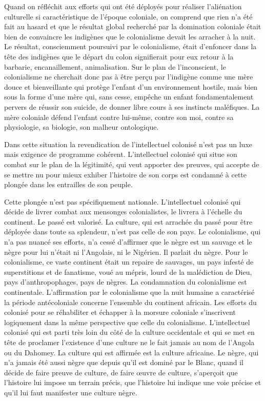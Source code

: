 \documentclass[french,twoside]{book} %
\begin{document}
\bigbreak
\noindent Quand on réfléchit aux efforts qui ont été déployés pour réaliser l’aliénation culturelle si caractéristique de l’époque coloniale, on comprend que rien n’a été fait au hasard et que le résultat global recherché par la domination coloniale était bien de convaincre les indigènes que le colonialisme devait les arracher à la nuit. Le résultat, consciemment poursuivi par le colonialisme, était d’enfoncer dans la tête des indigènes que le départ du colon signifierait pour eux retour à la barbarie, encanaillement, animalisation. Sur le plan de l’inconscient, le colonialisme ne cherchait donc pas à être perçu par l’indigène comme une mère douce et bienveillante qui protège l’enfant d’un environnement hostile, mais bien sous la forme d’une mère qui, sans cesse, empêche un enfant fondamentalement pervers de réussir son suicide, de donner libre cours à ses instincts maléfiques. La mère coloniale défend l’enfant contre lui-même, contre son moi, contre sa physiologie, sa biologie, son malheur ontologique.\par
\bigbreak
\noindent Dans cette situation la revendication de l’intellectuel colonisé n’est pas un luxe mais exigence de programme cohérent. L’intellectuel colonisé qui situe son combat sur le plan de la   légitimité, qui veut apporter des preuves, qui accepte de se mettre nu pour mieux exhiber l’histoire de son corps est condamné à cette plongée dans les entrailles de son peuple.\par
Cette plongée n’est pas spécifiquement nationale. L’intellectuel colonisé qui décide de livrer combat aux mensonges colonialistes, le livrera à l’échelle du continent. Le passé est valorisé. La culture, qui est arrachée du passé pour être déployée dans toute sa splendeur, n’est pas celle de son pays. Le colonialisme, qui n’a pas nuancé ses efforts, n’a cessé d’affirmer que le nègre est un sauvage et le nègre pour lui n’était ni l’Angolais, ni le Nigérien. Il parlait du nègre. Pour le colonialisme, ce vaste continent était un repaire de sauvages, un pays infesté de superstitions et de fanatisme, voué au mépris, lourd de la malédiction de Dieu, pays d’anthropophages, pays de nègres. La condamnation du colonialisme est continentale. L’affirmation par le colonialisme que la nuit humaine a caractérisé la période antécoloniale concerne l’ensemble du continent africain. Les efforts du colonisé pour se réhabiliter et échapper à la morsure coloniale s’inscrivent logiquement dans la même perspective que celle du colonialisme. L’intellectuel colonisé qui est parti très loin du côté de la culture occidentale et qui se met en tête de proclamer l’existence d’une culture ne le fait jamais au nom de l’Angola ou du Dahomey. La culture qui est affirmée est la culture africaine. Le nègre, qui n’a jamais été aussi nègre que depuis qu’il est dominé par le Blanc, quand il décide de faire preuve de culture, de faire œuvre de culture, s’aperçoit que l’histoire lui impose un terrain précis, que l’histoire lui indique une voie précise et qu’il lui faut manifester une culture nègre.\par
\end{document}

